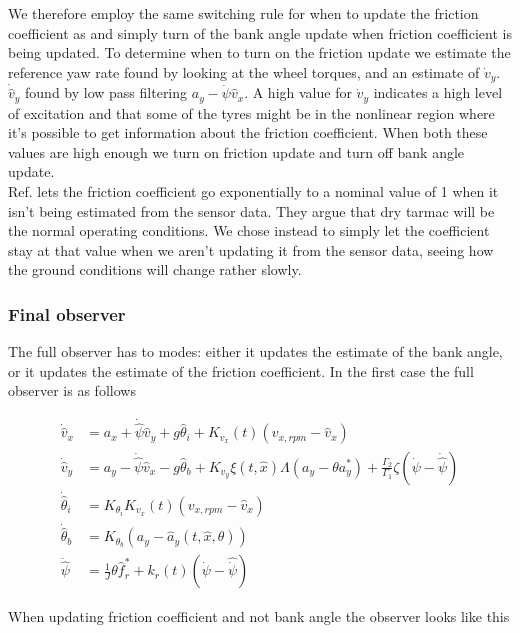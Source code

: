 We therefore employ the same switching rule for when to update the friction coefficient as \cite{MainStateEst} and simply turn of the bank angle update when friction coefficient is being updated. To determine when to turn on the friction update we estimate the reference yaw rate found by looking at the wheel torques, and an estimate of $\dot{v}_y$. $\dot{\hat{v}}_y$ found by low pass filtering $a_y - \dot{\psi}\hat{v}_x$. A high value for $\dot{v}_y$ indicates a high level of excitation and that some of the tyres might be in the nonlinear region where it's possible to get information about the friction coefficient. When both these values are high enough we turn on friction update and turn off bank angle update. \\ 

Ref. \cite{MainStateEst} lets the friction coefficient go exponentially to a nominal value of 1 when it isn't being estimated from the sensor data. They argue that dry tarmac will be the normal operating conditions. We chose instead to simply let the coefficient stay at that value when we aren't updating it from the sensor data, seeing how the ground conditions will change rather slowly.

\subsubsection{Final observer}
The full observer has to modes: either it updates the estimate of the bank angle, or it updates the estimate of the friction coefficient. In the first case the full observer is as follows

\begin{align}
    \dot{\hat{v}}_x & = a_x + \dot{\hat{\psi}}\hat{v}_y + g\hat{\theta}_i + K_{v_x}(t)(v_{x,rpm} - \hat{v}_x) \\
    \dot{\hat{v}}_y & = a_y - \dot{\hat{\psi}}\hat{v}_x - g\hat{\theta}_b + K_{v_y}\xi(t,\hat{x})\Lambda(a_y - \theta a_y^{*}) + \frac{\Gamma_2}{\Gamma_1}\zeta(\dot{\psi} - \dot{\hat{\psi}}) \\ 
    \dot{\hat{\theta}}_i & = K_{\theta_i}K_{v_x}(t)(v_{x,rpm} - \hat{v}_x) \\
    \dot{\hat{\theta}}_b & = K_{\theta_b}(a_y-\hat{a}_y(t,\hat{x},\theta)) \\ 
    \ddot{\hat{\psi}} & = \frac{1}{J}\theta \hat{f}_r^* + k_r(t)(\dot{\psi}-\hat{\dot{\psi}})
\end{align}

When updating friction coefficient and not bank angle the observer looks like this

